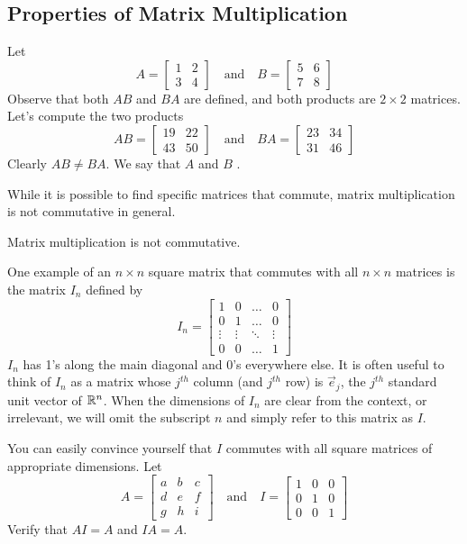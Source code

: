 \documentclass{ximera}
\begin{document}
\subsection*{Properties of Matrix Multiplication}
\begin{exploration}\label{init:matmultnotcomm}
Let $$A=\begin{bmatrix}1&2\\3&4\end{bmatrix}\quad\text{and}\quad B=\begin{bmatrix}5&6\\7&8\end{bmatrix}$$
Observe that both $AB$ and $BA$ are defined, and both products are $2\times 2$ matrices.  Let's compute the two products
$$AB=\begin{bmatrix}19&22\\43&50\end{bmatrix}\quad\text{and}\quad BA=\begin{bmatrix}23&34\\31&46\end{bmatrix}$$
Clearly $AB\neq BA$. We say that $A$ and $B$ .
\end{exploration}
While it is possible to find specific matrices that commute, matrix multiplication is not commutative in general.
\begin{warning}Matrix multiplication is not commutative.
\end{warning}

One example of an $n\times n$ square matrix that commutes with all $n\times n$ matrices is the matrix $I_n$ defined by
$$I_n=\begin{bmatrix}1&0&\ldots &0\\0&1&\ldots &0\\\vdots &\vdots &\ddots &\vdots \\0 &0 &\ldots & 1\end{bmatrix}$$
$I_n$ has 1's along the main diagonal and 0's everywhere else.  It is often useful to think of $I_n$ as a matrix whose $j^{th}$ column (and $j^{th}$ row) is $\vec{e}_j$, the $j^{th}$ standard unit vector of $\mathbb{R}^n$.  When the dimensions of $I_n$ are clear from the context, or irrelevant, we will omit the subscript $n$ and simply refer to this matrix as $I$.

You can easily convince yourself that $I$ commutes with all square matrices of appropriate dimensions.  Let $$A=\begin{bmatrix}a&b&c\\d&e&f\\g&h&i\end{bmatrix}\quad\text{and}\quad I=\begin{bmatrix}1&0&0\\0&1&0\\0&0&1\end{bmatrix}$$
Verify that $AI=A$ and $IA=A$.  
\end{document}
